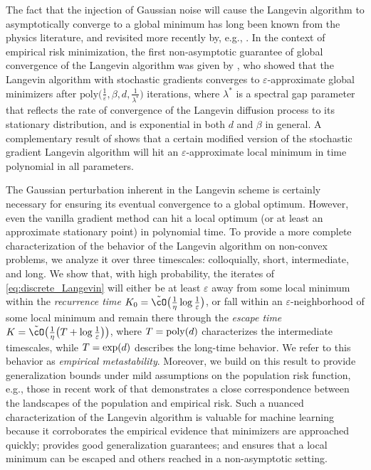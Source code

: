 \documentclass[final,12pt]{colt2018}
\numberwithin{equation}{section}
\numberwithin{equation}{section}
\def\tO{{\tilde{\cO}}}
\def\eps{\varepsilon}
\begin{document}
The fact that the injection of Gaussian noise will cause the Langevin algorithm to asymptotically converge to a global minimum has long been known from the physics literature, and revisited more recently by, e.g., \cite{wellingteh2011sgld}. In the context of empirical risk minimization, the first non-asymptotic guarantee of global convergence of the Langevin algorithm was given by \cite*{rrt_colt17}, who showed that the Langevin algorithm with stochastic gradients  converges to $\eps$-approximate global minimizers after $\mathrm{poly}\big(\frac{1}{\eps},\beta,d,\frac{1}{\lambda^*}\big)$ iterations, where $\lambda^*$ is a spectral gap parameter that reflects the rate of convergence of the Langevin diffusion process to its stationary distribution, and is exponential in both $d$ and $\beta$ in general.  A complementary result of \cite*{zhang2017hitting} shows that a certain modified version of the stochastic gradient Langevin algorithm will hit an $\eps$-approximate local minimum in time polynomial in all parameters.

The Gaussian perturbation inherent in the Langevin scheme is certainly necessary for ensuring its eventual convergence to a global optimum. However, even the vanilla gradient method can hit a local optimum (or at least an approximate stationary point) in polynomial time. To provide a more complete characterization of the behavior of the Langevin algorithm on non-convex problems, we analyze it over three timescales:  colloquially, short, intermediate, and long.  We show that, with high probability, the iterates of \eqref{eq:discrete_Langevin} will either be at least $\eps$ away from some local minimum within the \textit{recurrence time} $K_0  = \tO\big(\frac{1}{\eta}\log \frac{1}{\eps}\big)$, or fall within an $\eps$-neighborhood of some local minimum and remain there through the \textit{escape time} $K  =\tO\big(\frac{1}{\eta}\big(T + \log \frac{1}{\eps}\big)\big)$, where  $T = {\rm poly}(d)$ characterizes the intermediate timescales, while $T = {\rm exp}(d)$ describes the long-time behavior. We refer to this behavior as \textit{empirical metastability}. Moreover, we build on this result to provide generalization bounds under mild assumptions on the population risk function, e.g., those in recent work of \cite*{mei2016landscape} that demonstrates a close correspondence between the landscapes of the population and empirical risk.  Such a nuanced characterization of the Langevin algorithm is valuable for machine learning because it corroborates the empirical evidence that minimizers are approached quickly; provides good generalization guarantees; and ensures that a local minimum can be escaped and others reached in a non-asymptotic setting.
\end{document}
